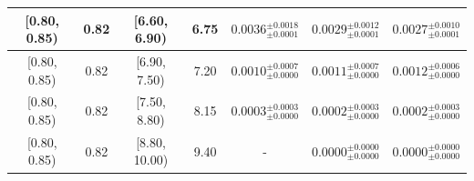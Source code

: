 \begin{longtable}{|c|c|c|c|c|c|c|}
\hline
[0.80, 0.85) & 0.82 & [6.60, 6.90) & 6.75 & $0.0036^{ \pm 0.0018 }_{ \pm 0.0001 }$ & $0.0029^{ \pm 0.0012 }_{ \pm 0.0001 }$ & $0.0027^{ \pm 0.0010 }_{ \pm 0.0001 }$ \\ 
\hline
[0.80, 0.85) & 0.82 & [6.90, 7.50) & 7.20 & $0.0010^{ \pm 0.0007 }_{ \pm 0.0000 }$ & $0.0011^{ \pm 0.0007 }_{ \pm 0.0000 }$ & $0.0012^{ \pm 0.0006 }_{ \pm 0.0000 }$ \\ 
\hline
[0.80, 0.85) & 0.82 & [7.50, 8.80) & 8.15 & $0.0003^{ \pm 0.0003 }_{ \pm 0.0000 }$ & $0.0002^{ \pm 0.0003 }_{ \pm 0.0000 }$ & $0.0002^{ \pm 0.0003 }_{ \pm 0.0000 }$ \\ 
\hline
[0.80, 0.85) & 0.82 & [8.80, 10.00) & 9.40 & - & $0.0000^{ \pm 0.0000 }_{ \pm 0.0000 }$ & $0.0000^{ \pm 0.0000 }_{ \pm 0.0000 }$ \\ 
\hline
\end{longtable}
\endgroup

